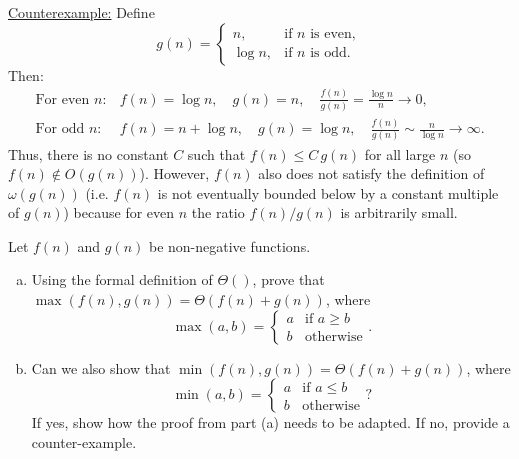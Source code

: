 \documentclass[11pt]{article}
\begin{document}
    \underline{Counterexample:} Define
    \[
    g(n)=
    \begin{cases}
    n, & \text{if \(n\) is even},\\[1mm]
    \log n, & \text{if \(n\) is odd}.
    \end{cases}
    \]
    Then:
    \[
    \begin{array}{rcl}
    \text{For even } n: & f(n)=\log n,\quad g(n)=n,\quad \frac{f(n)}{g(n)}=\frac{\log n}{n}\to 0,\\[1mm]
    \text{For odd } n: & f(n)= n+\log n,\quad g(n)=\log n,\quad \frac{f(n)}{g(n)}\sim \frac{n}{\log n}\to \infty.
    \end{array}
    \]
    Thus, there is no constant \(C\) such that \(f(n)\le C\,g(n)\) for all large \(n\) (so \(f(n)\notin O(g(n))\)). However, \(f(n)\) also does not satisfy the definition of \(\omega(g(n))\) (i.e. \(f(n)\) is not eventually bounded below by a constant multiple of \(g(n)\)) because for even \(n\) the ratio \(f(n)/g(n)\) is arbitrarily small. 
    
    \newpage
    \begin{tcolorbox}[title={Problem 3 (20 pts)}]
    Let $f(n)$ and $g(n)$ be non-negative functions. \begin{enumerate}[(a)]
        \item Using the formal definition of $\Theta()$, prove that $\max(f(n),g(n))=\Theta(f(n)+g(n))$, where \[\max(a, b)=\begin{cases}
        a &\text{if } a\geq b\\
        b &\text{otherwise}
    \end{cases}.\]
        \item Can we also show that $\min(f(n),g(n))=\Theta(f(n)+g(n))$, where \[\min(a, b)=\begin{cases}
        a &\text{if } a\leq b\\
        b &\text{otherwise}
    \end{cases}?\] If yes, show how the proof from part (a) needs to be adapted. If no, provide a counter-example.
    \end{enumerate}
    
    \end{tcolorbox}
    
\end{document}
